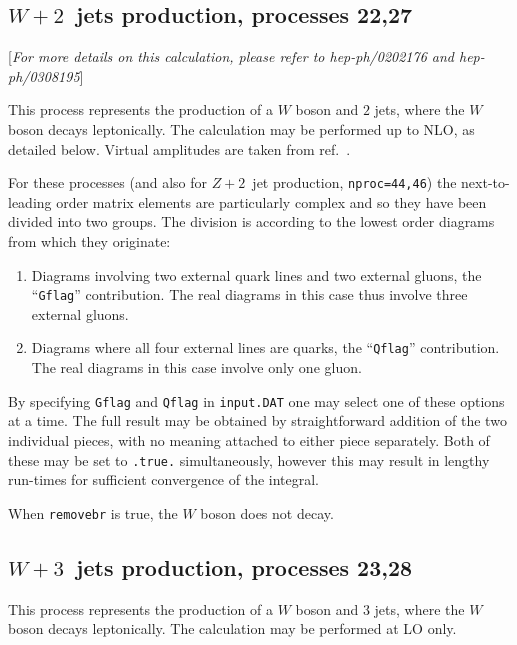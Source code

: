 \documentclass[12pt]{article}
\begin{document}
\subsection{$W+2$~jets production, processes 22,27}
\label{subsec:w2jets}

\begin{center}
[{\it For more details on this calculation, please refer to \break
 hep-ph/0202176 and hep-ph/0308195}]
\end{center}
This process represents the production of a $W$ boson and $2$ jets,
where the $W$ boson decays leptonically. The calculation may be
performed up to NLO, as detailed below. Virtual amplitudes are
taken from ref.~\cite{Bern:1997sc}.

For these processes (and also for $Z+2$~jet production, {\tt nproc=44,46})
the next-to-leading order matrix elements are
particularly complex and so they have been divided into two groups.
The division is according to the lowest order diagrams from which they
originate:
\begin{enumerate}
\item Diagrams involving two external quark lines and two external gluons,
the ``{\tt Gflag}'' contribution. The real diagrams in this case thus
involve three external gluons.

\item Diagrams where all four external lines are quarks,
the ``{\tt Qflag}'' contribution. The real diagrams in this case 
involve only one gluon.
\end{enumerate}

By specifying {\tt Gflag} and {\tt Qflag} in {\tt input.DAT} one may
select one of these options at a time. The full result may be obtained
by straightforward addition of the two individual pieces, with no
meaning attached to either piece separately. 
Both of these may be set to {\tt .true.} simultaneously, however this
may result in lengthy run-times for sufficient convergence of the integral.

When {\tt removebr} is true, the $W$ boson does not decay.

\subsection{$W+3$~jets production, processes 23,28}
\label{subsec:w3jets}

This process represents the production of a $W$ boson and $3$ jets,
where the $W$ boson decays leptonically. The calculation may be
performed at LO only.
\end{document}
